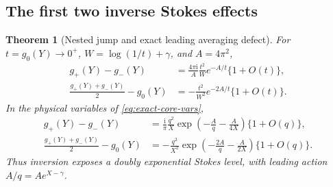 \documentclass[11pt,a4paper]{article}
\numberwithin{equation}{section}
\newtheorem{theorem}{Theorem}[section]
\theoremstyle{definition}\newtheorem{definition}[theorem]{Definition}
\theoremstyle{remark}\newtheorem{remark}[theorem]{Remark}
\newcommand{\ii}{\mathrm i}
\begin{document}
\subsection{The first two inverse Stokes effects}
\begin{theorem}[Nested jump and exact leading averaging defect]
\label{thm:nested}
For $t=g_0(Y)\to0^+$, $W=\log(1/t)+\gamma$, and $A=4\pi^2$,
\begin{align}
 g_+(Y)-g_-(Y)
 &=\frac{4\pi\ii}{A}\frac{t^2}{W}e^{-A/t}\{1+O(t)\},
 \label{eq:nested-jump}\\
 \frac{g_+(Y)+g_-(Y)}2-g_0(Y)
 &=-\frac{t^2}{W^2}e^{-2A/t}\{1+O(t)\}.
 \label{eq:nested-bias}
\end{align}
In the physical variables of \eqref{eq:exact-core-vars},
\begin{align}
 g_+(Y)-g_-(Y)
 &=\frac{\ii}{\pi}\frac{q^2}{X}
   \exp\left(-\frac A q-\frac{A}{4X}\right)\{1+O(q)\},
 \label{eq:nested-q}\\
 \frac{g_+(Y)+g_-(Y)}2-g_0(Y)
 &=-\frac{q^2}{X^2}
   \exp\left(-\frac{2A}{q}-\frac{A}{2X}\right)\{1+O(q)\}.
 \label{eq:bias-q}
\end{align}
Thus inversion exposes a doubly exponential Stokes level, with leading
action $A/q=Ae^{X-\gamma}$.
\end{theorem}
\end{document}
